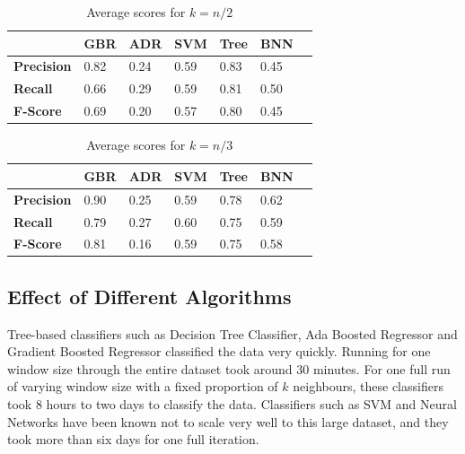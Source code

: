 \documentclass[letterpaper,11pt]{article}
\begin{document}
\begin{centering}
\begin{table}
\begin{tabular}{ | l | l | l | l | l | l | l |}
  \hline
   & \textbf{GBR}& \textbf{ADR} & \textbf{SVM} & \textbf{Tree} & \textbf{BNN}\\ \hline
  \textbf{Precision} & 0.82 & 0.24 & 0.59 & 0.83 & 0.45\\  \hline
  \textbf{Recall} & 0.66 & 0.29 & 0.59 & 0.81 & 0.50\\  \hline
  \textbf{F-Score} & 0.69 & 0.20 & 0.57 & 0.80 & 0.45\\  
  \hline
\end{tabular}
\label{table:k/2}
\caption{Average scores for $k=n/2$}
\end{table}
\end{centering}

\begin{centering}
\begin{table}
\begin{tabular}{ | l | l | l | l | l | l | l |}
  \hline
   & \textbf{GBR}& \textbf{ADR} & \textbf{SVM} & \textbf{Tree} & \textbf{BNN}\\ \hline
  \textbf{Precision} & 0.90 & 0.25 & 0.59 & 0.78 & 0.62 \\  \hline
  \textbf{Recall} & 0.79 & 0.27 & 0.60 & 0.75 & 0.59 \\  \hline
  \textbf{F-Score} & 0.81 & 0.16 & 0.59 & 0.75 & 0.58 \\  
  \hline
\end{tabular}
\label{table:k/3}
\caption{Average scores for $k=n/3$}  
\end{table}
\end{centering}

\subsection{Effect of Different Algorithms}
Tree-based classifiers such as Decision Tree Classifier, Ada Boosted Regressor and Gradient Boosted Regressor classified the data very quickly. Running for one window size through the entire dataset took around 30 minutes. For one full run of varying window size with a fixed proportion of $k$ neighbours, these classifiers took 8 hours to two days to classify the data. Classifiers such as SVM and Neural Networks have been known not to scale very well to this large dataset, and they took more than six days for one full iteration. 
\end{document}

